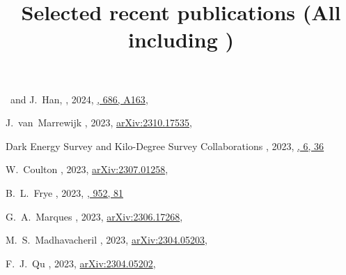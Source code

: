 
\title{Selected recent publications {\small (All including \myself)}}

\noindent


\begin{etaremune}

\item
\myself\ and J.~Han,
,
2024, \href{https://ui.adsabs.harvard.edu/abs/2024A&A...686A.163S/abstract}{\aap, 686, A163},
     
\item
J.~van~Marrewijk 
,
2023, \href{https://ui.adsabs.harvard.edu/abs/2023arXiv231006120V/abstract}{arXiv:2310.17535},
\submitted{\aap}

\item
Dark Energy Survey and Kilo-Degree Survey Collaborations 
,
2023, \href{https://ui.adsabs.harvard.edu/abs/2023OJAp....6E..36A/abstract}{\oja, 6, 36}

\item
W.~Coulton 
,
2023, \href{https://ui.adsabs.harvard.edu/abs/2023arXiv230701258C/abstract}{arXiv:2307.01258},
\submitted{\prd}

\item
B.~L.~Frye 
,
2023, \href{https://ui.adsabs.harvard.edu/abs/2023ApJ...952...81F/abstract}{\apj, 952, 81}

\item
G.~A.~Marques 
,
2023, \href{https://ui.adsabs.harvard.edu/abs/2023arXiv230617268M/abstract}{arXiv:2306.17268},
\accepted{\jcap}

\item
M.~S.~Madhavacheril 
,
2023, \href{https://ui.adsabs.harvard.edu/abs/2023arXiv230405203M/abstract}{arXiv:2304.05203},
\accepted{\apj}

\item
F.~J.~Qu 
,
2023, \href{https://ui.adsabs.harvard.edu/abs/2023arXiv230405202Q/abstract}{arXiv:2304.05202},
\accepted{\apj}


\end{etaremune}
